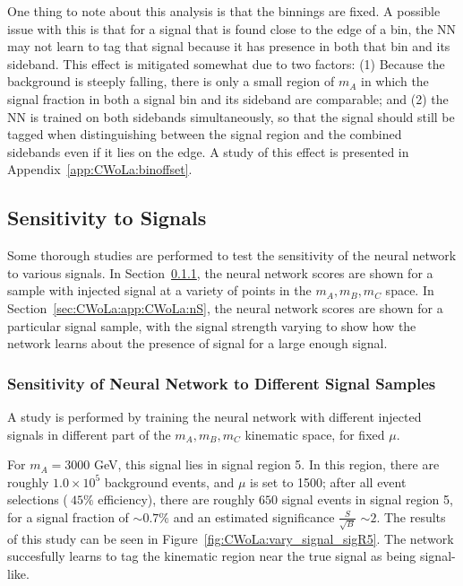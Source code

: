 One thing to note about this analysis is that the binnings are fixed.
A possible issue with this is that for a signal that is found close to the edge of a bin, the NN may not learn to tag that signal because it has presence in both that bin and its sideband.
This effect is mitigated somewhat due to two factors: (1) Because the background is steeply falling, there is only a small region of $m_A$ in which the signal fraction in both a signal bin and its sideband are comparable; and (2) the NN is trained on both sidebands simultaneously, so that the signal should still be tagged when distinguishing between the signal region and the combined sidebands even if it lies on the edge.
A study of this effect is presented in Appendix~\ref{app:CWoLa:binoffset}.

\subsection{Sensitivity to Signals}

Some thorough studies are performed to test the sensitivity of the neural network to various signals.
In Section~\ref{sec:CWoLa:app:CWoLa:vary_signal}, the neural network scores are shown for a sample with injected signal at a variety of points in the $m_A,m_B,m_C$ space.
In Section~\ref{sec:CWoLa:app:CWoLa:nS}, the neural network scores are shown for a particular signal sample, with the signal strength varying to show how the network learns about the presence of signal for a large enough signal.

\subsubsection{Sensitivity of Neural Network to Different Signal Samples}
\label{sec:CWoLa:app:CWoLa:vary_signal}
A study is performed by training the neural network with different injected signals in different part of the $m_A,m_B,m_C$ kinematic space, for fixed $\mu$.

For $m_A=3000$ GeV, this signal lies in signal region 5.
In this region, there are roughly $1.0\times10^5$ background events, and $\mu$ is set to 1500; after all event selections ($~45\%$ efficiency), there are roughly $650$ signal events in signal region 5, for a signal fraction of $\sim 0.7\%$ and an estimated significance $\frac{S}{\sqrt{B}}$ $\sim 2$.
The results of this study can be seen in Figure~\ref{fig:CWoLa:vary_signal_sigR5}.
The network succesfully learns to tag the kinematic region near the true signal as being signal-like.

